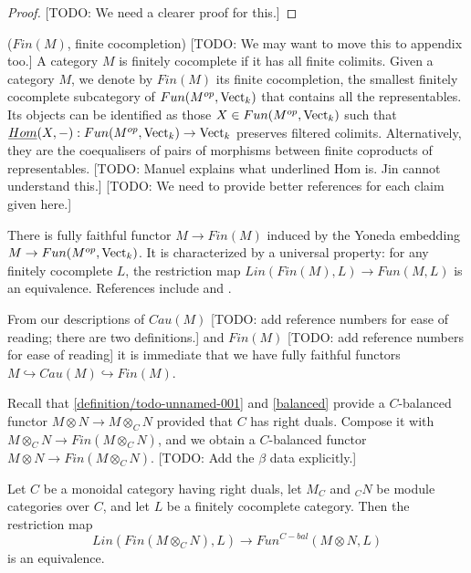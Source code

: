 \begin{proof}
  \cite[Remark 3.4]{douglas/balanced-product} [TODO: We need a clearer proof for this.]
\end{proof}

\begin{definition} \label{definition/finite-cocompletion} ($Fin(M)$, finite cocompletion)
  [TODO: We may want to move this to appendix too.]
  A category $M$ is finitely cocomplete if it has all finite colimits. Given a
  category $M$, we denote by $Fin(M)$ its finite cocompletion, the
  smallest finitely cocomplete subcategory of $Fun(M^{op},\operatorname{Vect}_k)$ that
  contains all the representables. Its objects can be identified as those
  $X\in Fun(M^{op},\operatorname{Vect}_k)$ such that
  $\underline{Hom}(X,-):Fun(M^{op},\operatorname{Vect}_k)\to \operatorname{Vect}_k$ preserves filtered
  colimits. Alternatively, they are the coequalisers of pairs of morphisms
  between finite coproducts of representables. [TODO: Manuel explains what underlined Hom is. Jin cannot understand this.] [TODO: We need to provide better references for each claim given here.]

  There is fully
  faithful functor $M\to Fin(M)$ induced by the Yoneda embedding $M \to Fun(M^{op}, \operatorname{Vect}_{k})$. It is characterized by a universal
  property: for any finitely cocomplete $L$, the restriction map
  $Lin(Fin(M),L)\to Fun(M,L)$ is an equivalence. References include
  \cite[Section 5.7]{kelly/basic-concepts-enriched} and \cite[Section
  2.2.1]{lopezfranco/tensor-products}.
\end{definition}

\begin{remark}
  From our descriptions of $Cau(M)$ [TODO: add reference numbers for ease of reading; there are two definitions.] and $Fin(M)$ [TODO: add reference numbers for ease of reading] it is immediate that we have
  fully faithful functors $M\hookrightarrow Cau(M)\hookrightarrow Fin(M)$.
\end{remark}

Recall that \ref{definition/todo-unnamed-001} and \ref{balanced} provide a $C$-balanced functor
$M\otimes N \to M\otimes_C N$ provided that $C$ has right duals. Compose it with
$M\otimes_C N \to Fin(M\otimes_C N)$, and we obtain a $C$-balanced functor
$M\otimes N\to Fin(M\otimes_C N)$. [TODO: Add the $\beta$ data explicitly.]

\begin{lemma}\label{univ_finbal}

  Let $C$ be a monoidal category having right duals, let $M_C$ and $_{C}N$ be
  module categories over $C$, and let $L$ be a finitely cocomplete category. Then the
  restriction map $$Lin(Fin(M\otimes_C N),L)\to Fun^{C-bal}(M\otimes N,L)$$ is
  an equivalence.
\end{lemma}

